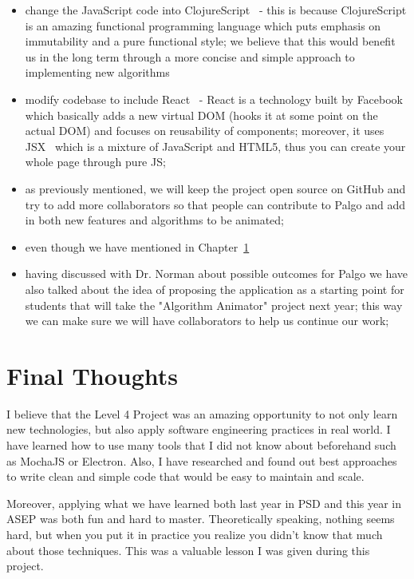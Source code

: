 \documentclass{l4proj}
\begin{document}
\begin{itemize}
  \item change the JavaScript code into ClojureScript~\cite{clojurescript} - this is because ClojureScript is an
    amazing functional programming language which puts emphasis on immutability and a pure functional style; we
    believe that this would benefit us in the long term through a more concise and simple approach to implementing new
    algorithms
  \item modify codebase to include React~\cite{react} - React is a technology built by Facebook which basically adds a
    new virtual DOM (hooks it at some point on the actual DOM) and focuses on reusability of components; moreover, it
    uses JSX~\cite{jsx} which is a mixture of JavaScript and HTML5, thus you can create your whole page through pure
    JS; 
  \item as previously mentioned, we will keep the project open source on GitHub and try to add more collaborators so
    that people can contribute to Palgo and add in both new features and algorithms to be animated;
  \item even though we have mentioned in Chapter~\ref{}
  \item having discussed with Dr. Norman about possible outcomes for Palgo we have also talked about the idea of
    proposing the application as a starting point for students that will take the "Algorithm Animator" project next
    year; this way we can make sure we will have collaborators to help us continue our work;

\end{itemize}

\section{Final Thoughts}

I believe that the Level 4 Project was an amazing opportunity to not only learn new technologies, but also apply
software engineering practices in real
world. I have learned how to use many tools that I did not know about beforehand such as MochaJS or Electron. Also, I
have researched and found out best approaches to write clean and simple code that would be easy to maintain and scale. 

Moreover, applying what we have learned both last year in PSD and this year in ASEP was both fun and hard to master.
Theoretically speaking, nothing seems hard, but when you put it in practice you realize you didn't know that much about
those techniques. This was a valuable lesson I was given during this project.
\end{document}

